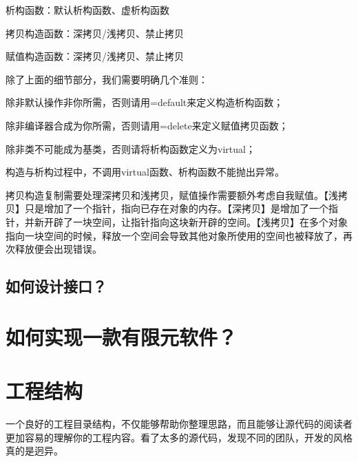 析构函数：默认析构函数、虚析构函数

拷贝构造函数：深拷贝/浅拷贝、禁止拷贝

赋值构造函数：深拷贝/浅拷贝、禁止拷贝

除了上面的细节部分，我们需要明确几个准则：

除非默认操作非你所需，否则请用=default来定义构造析构函数；

除非编译器合成为你所需，否则请用=delete来定义赋值拷贝函数；

除非类不可能成为基类，否则请将析构函数定义为virtual；

构造与析构过程中，不调用virtual函数、析构函数不能抛出异常。

拷贝构造复制需要处理深拷贝和浅拷贝，赋值操作需要额外考虑自我赋值。【浅拷贝】只是增加了一个指针，指向已存在对象的内存。【深拷贝】是增加了一个指针，并新开辟了一块空间，让指针指向这块新开辟的空间。【浅拷贝】在多个对象指向一块空间的时候，释放一个空间会导致其他对象所使用的空间也被释放了，再次释放便会出现错误。

\subsection{如何设计接口？}
\section{如何实现一款有限元软件？}

\section{工程结构}
一个良好的工程目录结构，不仅能够帮助你整理思路，而且能够让源代码的阅读者更加容易的理解你的工程内容。看了太多的源代码，发现不同的团队，开发的风格真的是迥异。
